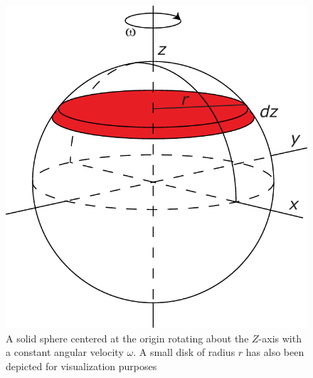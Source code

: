 \begin{figure}[H]
  \centering
  \includegraphics[width=0.25\linewidth]{fig/images/rotating_solid_sphere.pdf}
  \caption{A solid sphere centered at the origin rotating about the $Z$-axis with a constant angular velocity $\omega$. A small disk of radius $r$ has also been depicted for visualization purposes}
  \label{fig:rotating_solid_sphere}
\end{figure}